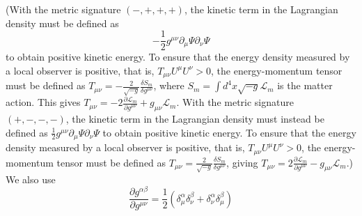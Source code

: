 \documentclass[english]{article}
\begin{document}
(With the metric signature $(-,+,+,+)$, the kinetic term in the Lagrangian
density must be defined as 
\[
-\frac{1}{2}g^{\mu\nu}\partial_{\mu}\Psi\partial_{\nu}\Psi
\]
 to obtain positive kinetic energy. To ensure that the energy density
measured by a local observer is positive, that is, $T_{\mu\nu}U^{\mu}U^{\nu}>0$,
the energy-momentum tensor must be defined as $T_{\mu\nu}=-\frac{2}{\sqrt{-g}}\frac{\delta S_{m}}{\delta g^{\mu\nu}}$,
where $S_{m}=\int d^{4}x\sqrt{-g}\mathcal{L}_{m}$ is the matter action.
This gives $T_{\mu\nu}=-2\frac{\partial\mathcal{L}_{m}}{\partial g^{\mu\nu}}+g_{\mu\nu}\mathcal{L}_{m}$.
With the metric signature $(+,-,-,-)$, the kinetic term in the Lagrangian
density must instead be defined as $\frac{1}{2}g^{\mu\nu}\partial_{\mu}\Psi\partial_{\nu}\Psi$
to obtain positive kinetic energy. To ensure that the energy density
measured by a local observer is positive, that is, $T_{\mu\nu}U^{\mu}U^{\nu}>0$,
the energy-momentum tensor must be defined as $T_{\mu\nu}=\frac{2}{\sqrt{-g}}\frac{\delta S_{m}}{\delta g^{\mu\nu}}$,
giving $T_{\mu\nu}=2\frac{\partial\mathcal{L}_{m}}{\partial g^{\mu\nu}}-g_{\mu\nu}\mathcal{L}_{m}$.)
We also use 
\[
\ensuremath{\frac{\partial g^{\alpha\beta}}{\partial g^{\mu\nu}}=\frac{1}{2}\left(\delta^{\alpha}_{\!\mu}\delta^{\beta}_{\!\nu}+\delta^{\alpha}_{\!\nu}\delta^{\beta}_{\!\mu}\right)}
\]
\end{document}
